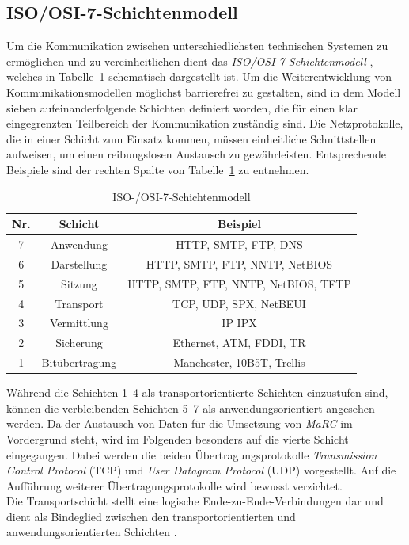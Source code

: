 \subsection{ISO/OSI-7-Schichtenmodell}\label{sec:Netzwerk}
Um die Kommunikation zwischen unterschiedlichsten technischen Systemen zu ermöglichen und zu vereinheitlichen dient das \textit{ISO/OSI-7-Schichtenmodell} \cite{ITU}, welches in Tabelle~\ref{tab:Schichtenmodell} schematisch dargestellt ist. Um die Weiterentwicklung von Kommunikationsmodellen möglichst barrierefrei zu gestalten, sind in dem Modell sieben aufeinanderfolgende Schichten definiert worden, die für einen klar eingegrenzten Teilbereich der Kommunikation zuständig sind. Die Netzprotokolle, die in einer Schicht zum Einsatz kommen, müssen einheitliche Schnittstellen aufweisen, um einen reibungslosen Austausch zu gewährleisten. Entsprechende Beispiele sind der rechten Spalte von Tabelle~\ref{tab:Schichtenmodell} zu entnehmen.\\

\begin{table}
	\centering
	\renewcommand{\arraystretch}{1.4}
	\begin{tabular}{|c|c|c|}
		\hline
		\Absatzbox{}
		\textbf{Nr.} & \textbf{Schicht}&\textbf{Beispiel}\\
		\hline
		7 & Anwendung &  HTTP, SMTP, FTP, DNS\\
		\hline
		6 & Darstellung & HTTP, SMTP, FTP, NNTP, NetBIOS\\
		\hline
		5 & Sitzung& HTTP, SMTP, FTP, NNTP, NetBIOS, TFTP\\
		\hline
		4 & Transport & TCP, UDP, SPX, NetBEUI\\
		\hline
		3 & Vermittlung& IP IPX\\
		\hline
		2 & Sicherung & Ethernet, ATM, FDDI, TR\\
		\hline
		1 & Bitübertragung & Manchester, 10B5T, Trellis\\
		\hline
	\end{tabular}
	\caption{ISO-/OSI-7-Schichtenmodell}
	\label{tab:Schichtenmodell}
\end{table}

Während die Schichten 1--4 als transportorientierte Schichten einzustufen sind, können die verbleibenden Schichten 5--7 als anwendungsorientiert angesehen werden. Da der Austausch von Daten für die Umsetzung von \textit{MaRC} im Vordergrund steht, wird im Folgenden besonders auf die vierte Schicht eingegangen. Dabei werden die beiden Übertragungsprotokolle \textit{Transmission Control Protocol} (TCP) und \textit{User Datagram Protocol} (UDP) vorgestellt. Auf die Aufführung weiterer Übertragungsprotokolle wird bewusst verzichtet.\\
Die Transportschicht stellt eine logische Ende-zu-Ende-Verbindungen dar und dient als Bindeglied zwischen den transportorientierten und anwendungsorientierten Schichten \cite{ITU}.

